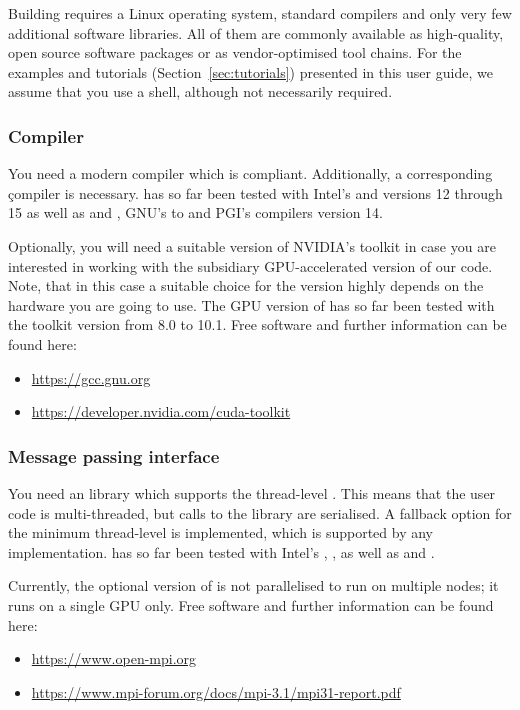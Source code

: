 \documentclass[a4paper, 11pt, DIV=11]{scrartcl}
\begin{document}
Building \nsc requires a Linux operating system, standard compilers and only
very few additional software libraries. All of them are commonly available as
high-quality, open source software packages or as vendor-optimised tool chains.
For the examples and tutorials (Section~\ref{sec:tutorials}) presented in this user
guide, we assume that you use a  shell, although not necessarily
required.

\subsubsection{Compiler}
\label{sec:compiler}

You need a modern \fortran compiler which is
\href{https://en.wikipedia.org/wiki/OpenMP}{} compliant.
Additionally, a corresponding \c compiler is necessary. \nsc has so far been
tested with Intel's  and  versions 12 through 15 as well as
 and , GNU's  to  and
PGI's compilers version 14.
\par
Optionally, you will need a suitable version of NVIDIA's \cuda toolkit in case
you are interested in working with the subsidiary GPU-accelerated version of our
code. Note, that in this case a suitable choice for the \cuda version highly
depends on the hardware you are going to use. The GPU version of \nsc has so
far been tested with the \cuda toolkit version from 8.0 to 10.1. Free software
and further information can be found here:
\begin{itemize}
\item \url{https://gcc.gnu.org}
\item \url{https://developer.nvidia.com/cuda-toolkit}
\end{itemize}

\subsubsection{Message passing interface}
\label{sec:mpi}

You need an \mpi library which supports the thread-level .
This means that the user code is multi-threaded, but calls to the \mpi library are
serialised. A fallback option for the minimum thread-level is implemented, which is
supported by any \mpi implementation. \nsc has so far been tested with Intel's
, ,  as well as  and .
\par
Currently, the optional \cuda version of \nsc is not parallelised to run on multiple
nodes; it runs on a single GPU only. Free software and further information can be found
here:
\begin{itemize}
\item \url{https://www.open-mpi.org}
\item \url{https://www.mpi-forum.org/docs/mpi-3.1/mpi31-report.pdf}
\end{itemize}
\end{document}
